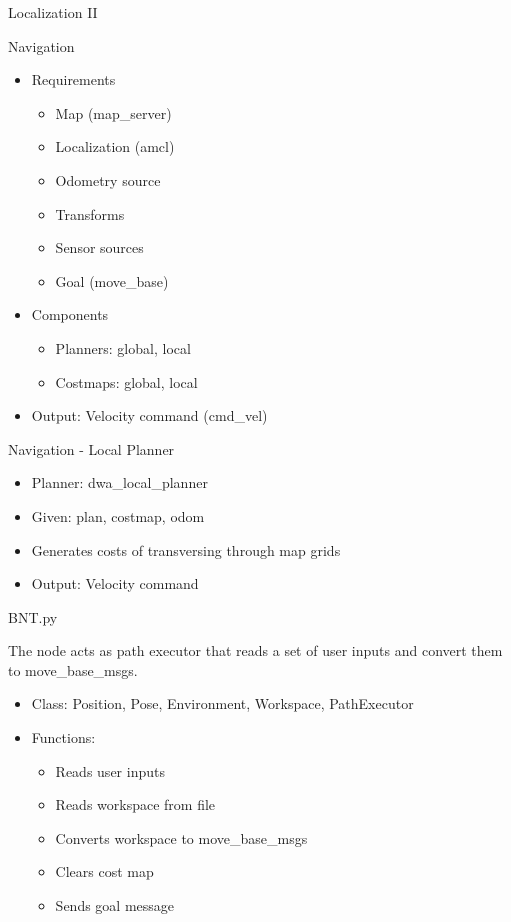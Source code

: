 \begin{frame}{Localization II}
\end{frame}
\begin{frame}{Navigation}
\begin{itemize}
	\item Requirements
		\begin{itemize}
			\item Map (map\_server)
			\item Localization (amcl)
			\item Odometry source
			\item Transforms
			\item Sensor sources
			\item Goal (move\_base) 
		\end{itemize}
	\item Components
		\begin{itemize}
			\item Planners: global, local
			\item Costmaps: global, local
		\end{itemize}
	\item Output: Velocity command (cmd\_vel)
\end{itemize}
\end{frame}
\begin{frame}{Navigation - Local Planner}
\begin{itemize}
	\item Planner: dwa\_local\_planner
	\item Given: plan, costmap, odom
	\item Generates costs of transversing through map grids
	\item Output: Velocity command
\end{itemize}
\end{frame}
\begin{frame}{BNT.py}
    
    The node acts as path executor that reads  a set of user inputs and convert them to move\_base\_msgs.
    \begin{itemize}
        \item Class: Position, Pose, Environment, Workspace, PathExecutor
        
        \item Functions:
        \begin{itemize}
        	\item Reads user inputs
        	\item Reads workspace from file
            \item Converts workspace to move\_base\_msgs
            \item Clears cost map
            \item Sends goal message
        \end{itemize}
    \end{itemize}
    
\end{frame}
